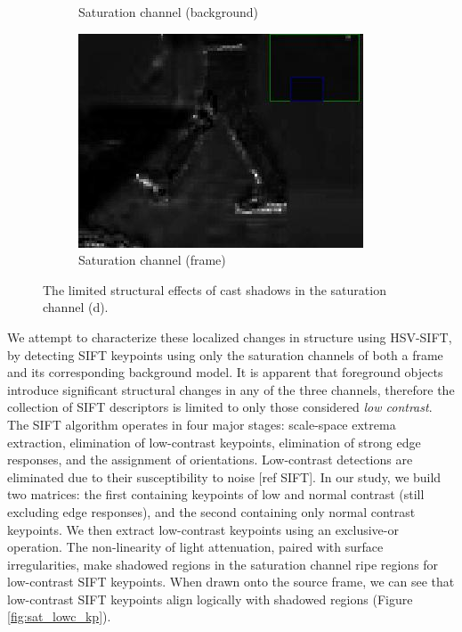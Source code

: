 \documentclass[12pt]{report}
\begin{document}
\begin{figure}
\begin{subfigure}{.49\linewidth}
  \caption{Saturation channel (background)}
\end{subfigure}
\hfill
\begin{subfigure}{.49\linewidth}
  \includegraphics[width=1\linewidth]{figures/lab_sat_fg_zoom_0161.jpg}
  \caption{Saturation channel (frame)}
\end{subfigure}

\caption{The limited structural effects of cast shadows in the saturation channel (d).}
\label{fig:sat_struct}
\end{figure}

We attempt to characterize these localized changes in structure using HSV-SIFT, by detecting SIFT keypoints using only the saturation channels of both a frame and its corresponding background model. It is apparent that foreground objects introduce significant structural changes in any of the three channels, therefore the collection of SIFT descriptors is limited to only those considered \textit{low contrast}. The SIFT algorithm operates in four major stages: scale-space extrema extraction, elimination of low-contrast keypoints, elimination of strong edge responses, and the assignment of orientations. Low-contrast detections are eliminated due to their susceptibility to noise [ref SIFT]. In our study, we build two matrices: the first containing keypoints of low and normal contrast (still excluding edge responses), and the second containing only normal contrast keypoints. We then extract low-contrast keypoints using an exclusive-or operation. The non-linearity of light attenuation, paired with surface irregularities, make shadowed regions in the saturation channel ripe regions for low-contrast SIFT keypoints. When drawn onto the source frame, we can see that low-contrast SIFT keypoints align logically with shadowed regions (Figure \ref{fig:sat_lowc_kp}). 
\end{document}
